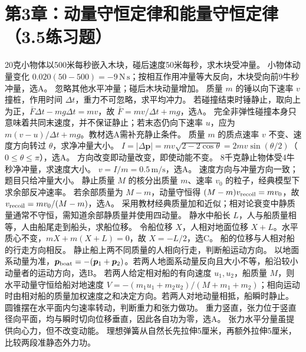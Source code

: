 \section{第3章：动量守恒定律和能量守恒定律（3.5练习题）}
\problemtext 20克小物体以500米每秒嵌入木块，碰后速度50米每秒，求木块受冲量。
\workings 小物体动量变化 $0.020(50-500)=-9\,\mathrm{N\,s}$；按相互作用冲量等大反向，木块受向前9牛秒冲量，选A。
\crosscheck 忽略其他水平冲量；碰后木块动量增加。
\problemtext 质量 $m$ 的锤以向下速率 $v$ 撞桩，作用时间 $\Delta t$，重力不可忽略，求平均冲力。
\workings 若碰撞结束时锤静止，取向上为正，$\bar F\Delta t-mg\Delta t=mv$，故 $\bar F=mv/\Delta t+mg$，选A。
\crosscheck 完全非弹性碰撞本身只意味着共同末速度，并不保证静止；若末态仍向下速率 $u$，应为 $m(v-u)/\Delta t+mg$。教材选A需补充静止条件。
\problemtext 质量 $m$ 的质点速率 $v$ 不变、速度方向转过 $\theta$，求净冲量大小。
\workings $I=|\Delta\bm p|=mv\sqrt{2-2\cos\theta}=2mv\sin(\theta/2)$（$0\le\theta\le\pi$），选A。
\crosscheck 方向改变即动量改变，即使动能不变。
\problemtext 8千克静止物体受4牛秒净冲量，求速度大小。
\workings $v=I/m=0.5\,\mathrm{m/s}$，选A。
\crosscheck 速度方向与冲量方向一致；题目只给冲量大小。
\problemtext 静止质量 $M$ 的核分出质量 $m$、速率 $v_0$ 的粒子，经典模型下求余部反冲速率。
\workings 若余部质量为 $M-m$，动量守恒得 $(M-m)v_{\rm recoil}=mv_0$，故 $v_{\rm recoil}=mv_0/(M-m)$，选A。
\crosscheck 采用教材经典质量加和近似；相对论衰变中静质量通常不守恒，需知道余部静质量并使用四动量。
\problemtext 静水中船长 $L$，人与船质量相等，人由船尾走到船头，求船位移。
\workings 令船位移 $X$，人相对地面位移 $X+L$。水平质心不变，$mX+m(X+L)=0$，故 $X=-L/2$，选C。
\crosscheck 船的位移与人相对船的行走方向相反。
\problemtext 静止船上两不同质量的人相向行走，判断船运动方向。
\workings 以地面系动量为准，$\bm p_{\rm boat}=-(\bm p_1+\bm p_2)$。若两人地面系动量反向且大小不等，船沿较小动量者的运动方向，选B。
\crosscheck 若两人给定相对船的有向速度 $u_1,u_2$，船质量 $M$，则水平动量守恒给船对地速度 $V=-(m_1u_1+m_2u_2)/(M+m_1+m_2)$；相向运动时由相对船的质量加权速度之和决定方向。若两人对地动量相抵，船瞬时静止。
\problemtext 圆锥摆在水平面内匀速率转动，判断重力和张力做功。
\workings 重力竖直，张力位于竖直径向平面，均与瞬时切向位移垂直，因此各自功为零，选A。
\crosscheck 张力水平分量虽提供向心力，但不改变动能。
\problemtext 理想弹簧从自然长先拉伸5厘米，再额外拉伸5厘米，比较两段准静态外力功。
